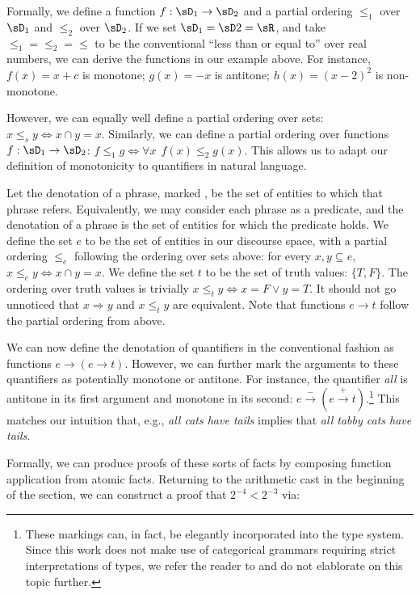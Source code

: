 \documentclass[11pt,a4paper]{article}
\begin{document}
Formally, we define a function $f:\sD_1 \rightarrow \sD_2$ and a partial
  ordering $\le_1$ over $\sD_1$ and $\le_2$ over $\sD_2$.
If we set $\sD_1 = \sD2 = \sR$, and take $\le_1 = \le_2 = \le$ to be
  the conventional ``less than or equal to'' over real numbers,
  we can derive the functions in our example above.
For instance, $f(x) = x + c$ is monotone; $g(x) = -x$ is antitone;
  $h(x) = (x-2)^2$ is non-monotone.

However, we can equally well define a partial ordering over sets:
  $x \le_s y \Leftrightarrow x \cap y = x$.
Similarly, we can define a partial ordering over functions
  $f : \sD_1 \rightarrow \sD_2$:
  $f \le_1 g \Leftrightarrow \forall x ~~ f(x) \leq_2 g(x)$.
This allows us to adapt our definition of monotonicity to quantifiers
  in natural language.

Let the denotation of a phrase, marked \denote{\cdot}, be the set of
  entities to which that phrase refers.
Equivalently, we may consider each phrase as a predicate, and the denotation
  of a phrase is the set of entities for which the predicate holds.
We define the set $e$ to be the set of entities in our discourse space,
  with a partial ordering $\le_e$ following the ordering over sets
  above: for every $x,y \subseteq e$, $x \le_e y \Leftrightarrow x \cap y = x$.
We define the set $t$ to be the set of truth values: $\{T, F\}$.
The ordering over truth values is trivially
  $x \le_t y \Leftrightarrow x = F \lor y = T$.
It should not go unnoticed that $x \Rightarrow y$ and $x \le_t y$ 
  are equivalent.
Note that functions $e \rightarrow t$ follow the partial ordering from
  above.

We can now define the denotation of quantifiers in the conventional
  fashion as functions $e \rightarrow (e \rightarrow t)$.
However, we can further mark the arguments to these quantifiers as
  potentially monotone or antitone.
For instance, the quantifier \textit{all} is antitone in its first
  argument and monotone in its second:
  $e \xrightarrow{-} (e \xrightarrow{+} t)$.\footnote{
    These markings can, in fact, be elegantly incorporated into the
    type system. Since this work does not make use of categorical
    grammars requiring strict interpretations of types, we refer the
    reader to \citet{key:2014icard-natlog} and do not elablorate
    on this topic further.
  }
This matches our intuition that, e.g., \textit{all cats have tails}
  implies that \textit{all tabby cats have tails}.

Formally, we can produce proofs of these sorts of facts by composing
  function application from atomic facts.
Returning to the arithmetic cast in the beginning of the section, we
  can construct a proof that $2^{-4} < 2^{-3}$ via:
\end{document}
